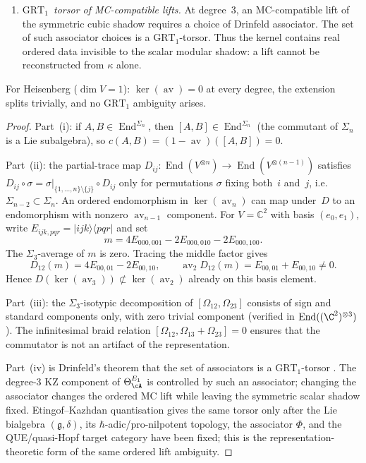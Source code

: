 \begin{proposition}
\begin{enumerate}[label=\textup{(\roman*)}]
 $\mathfrak{C}(\cA)
 =\tau_{\cA,3}^{\mathrm{res}}q_3(\Phi_{\mathrm{KZ}})$.
\item \emph{$\mathrm{GRT}_1$~torsor of MC-compatible lifts.}
 At degree~$3$, an MC-compatible lift of the symmetric cubic shadow
 requires a choice of Drinfeld associator.  The set of such
 associator choices is a $\mathrm{GRT}_1$-torsor.  Thus the kernel
 contains real ordered data invisible to the scalar modular shadow:
 a lift cannot be reconstructed from $\kappa$ alone.
\end{enumerate}
For Heisenberg \textup{(}$\dim V = 1$\textup{)}:
$\ker(\operatorname{av}) = 0$ at every degree, the extension
splits trivially, and no $\mathrm{GRT}_1$ ambiguity arises.
\end{proposition}

\begin{proof}
Part~(i): if $A, B \in \operatorname{End}^{\Sigma_n}$, then
$[A,B] \in \operatorname{End}^{\Sigma_n}$
(the commutant of $\Sigma_n$ is a Lie subalgebra), so
$c(A,B) = (1 - \operatorname{av})([A,B]) = 0$.

Part~(ii): the partial-trace map
$D_{ij}\colon \operatorname{End}(V^{\otimes n}) \to
\operatorname{End}(V^{\otimes (n-1)})$
satisfies
$D_{ij} \circ \sigma = \sigma|_{\{1,\ldots,n\}\setminus\{j\}}
\circ D_{ij}$
only for permutations $\sigma$ fixing both~$i$ and~$j$,
i.e.\ $\Sigma_{n-2} \subset \Sigma_n$. An
ordered endomorphism in $\ker(\operatorname{av}_n)$
can map under~$D$ to an endomorphism with nonzero
$\operatorname{av}_{n-1}$ component.  For $V=\mathbb C^2$ with
basis $(e_0,e_1)$, write
$E_{ijk,pqr}=|ijk\rangle\langle pqr|$ and set
\[
 m=4E_{000,001}-2E_{000,010}-2E_{000,100}.
\]
The $\Sigma_3$-average of $m$ is zero.  Tracing the middle factor
gives
\[
 D_{12}(m)=4E_{00,01}-2E_{00,10},\qquad
 \operatorname{av}_2D_{12}(m)=E_{00,01}+E_{00,10}\neq0.
\]
Hence
$D(\ker(\operatorname{av}_3))\not\subset
\ker(\operatorname{av}_2)$ already on this basis element.

Part~(iii): the $\Sigma_3$-isotypic decomposition of
$[\Omega_{12}, \Omega_{23}]$ consists of sign and standard
components only, with zero trivial component (verified
in $\operatorname{End}((\C^2)^{\otimes 3})$). The
infinitesimal braid relation
$[\Omega_{12}, \Omega_{13} + \Omega_{23}] = 0$ ensures that the
commutator is not an artifact of the representation.

Part~(iv) is Drinfeld's theorem that the set of associators is a
$\mathrm{GRT}_1$-torsor \cite{Drinfeld90}.  The degree-$3$ KZ
component of $\Theta^{E_1}_\cA$ is controlled by such an associator;
changing the associator changes the ordered MC lift while leaving the
symmetric scalar shadow fixed.  Etingof--Kazhdan quantisation
\cite{EK96} gives the same torsor only after the Lie bialgebra
\((\mathfrak g,\delta)\), its \(\hbar\)-adic/pro-nilpotent topology,
the associator \(\Phi\), and the QUE/quasi-Hopf target category have
been fixed; this is the representation-theoretic form of the same
ordered lift ambiguity.
\end{proof}


